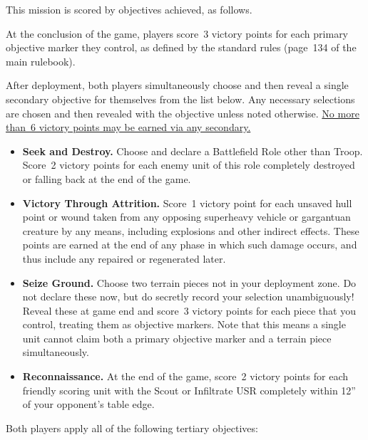 \documentclass{40k}
\begin{document}
This mission is scored by objectives achieved, as follows.

 At the conclusion of the game,
players score~3 victory points for each primary objective marker they
control, as defined by the standard rules (page~134 of the main
rulebook).



After deployment, both players simultaneously choose and then reveal a
single secondary objective for themselves from the list below.  Any
necessary selections are chosen and then revealed with the objective
unless noted otherwise.  \underline{No more than~6 victory points may
  be earned via any secondary.}

\begin{itemize}
\item \textbf{Seek and Destroy.}  Choose and declare a Battlefield
  Role other than Troop.  Score~2 victory points for each enemy unit
  of this role completely destroyed or falling back at the end of the
  game.

\item \textbf{Victory Through Attrition.}  Score~1 victory point for
  each unsaved hull point or wound taken from any opposing superheavy
  vehicle or gargantuan creature by any means, including explosions
  and other indirect effects.  These points are earned at the end of
  any phase in which such damage occurs, and thus include any repaired
  or regenerated later.

\item \textbf{Seize Ground.}  Choose two terrain pieces not in your
  deployment zone.  Do not declare these now, but do secretly record
  your selection unambiguously!  Reveal these at game end and score~3
  victory points for each piece that you control, treating them as
  objective markers.  Note that this means a single unit cannot claim
  both a primary objective marker and a terrain piece simultaneously.

\item \textbf{Reconnaissance.}  At the end of the game, score~2
  victory points for each friendly scoring unit with the Scout or
  Infiltrate USR completely within 12'' of your opponent's table edge.

\end{itemize}


  Both players apply all of
the following tertiary objectives:
\end{document}

